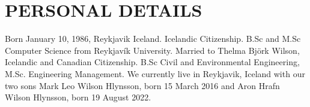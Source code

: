 \section{PERSONAL DETAILS}
Born January 10, 1986, Reykjavik Iceland.  Icelandic Citizenship. B.Sc and M.Sc
Computer Science from Reykjavík University.  Married to Thelma Björk Wilson,
Icelandic and Canadian Citizenship. B.Sc Civil and Environmental Engineering,
M.Sc. Engineering Management. We currently live in Reykjavik, Iceland with our
two sons Mark Leo Wilson Hlynsson, born 15 March 2016 and Aron Hrafn Wilson
Hlynsson, born 19 August 2022.
